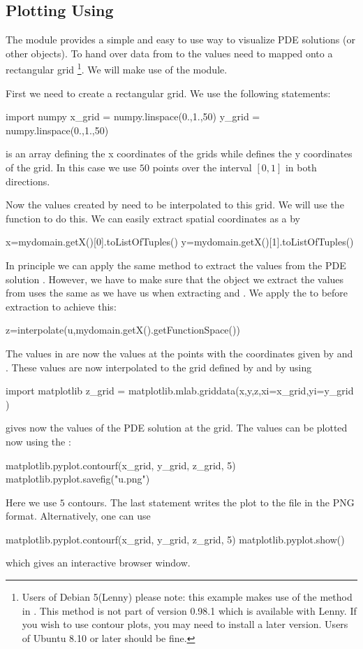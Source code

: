 \subsection{Plotting Using \MATPLOTLIB}
The \MATPLOTLIB module provides a simple and easy to use way to visualize PDE solutions (or other \Data objects). 
To hand over data from \escript to \MATPLOTLIB the values need to mapped onto a rectangular grid
\footnote{Users of Debian 5(Lenny) please note: this example makes use of the  method in .
This method is not part of version 0.98.1 which is available with Lenny.
If you wish to use contour plots, you may need to install a later version.
Users of Ubuntu 8.10 or later should be fine.}. We will make use 
of the \numpy module.

First we need to create a rectangular grid. We use the following statements:
\begin{python}
import numpy
x_grid = numpy.linspace(0.,1.,50)
y_grid = numpy.linspace(0.,1.,50)
\end{python}
 is an array defining the x coordinates of the grids while 
 defines the y coordinates of the grid. In this case we use $50$ points over the interval $[0,1]$
in both directions. 

Now the values created by \escript need to be interpolated to this grid. We will use the \MATPLOTLIB
{} function to do this. We can easily extract spatial coordinates as a  by
\begin{python}
x=mydomain.getX()[0].toListOfTuples()
y=mydomain.getX()[1].toListOfTuples()
\end{python}
In principle we can apply the same  method to extract the values from the 
PDE solution . However, we have to make sure that the \Data object we extract the values from 
uses the same \FunctionSpace as we have us when extracting  and . We apply the 
 to  before extraction to achieve this:
\begin{python}
z=interpolate(u,mydomain.getX().getFunctionSpace())
\end{python}
The values in  are now the values at the points with the coordinates given by  and . These 
values are now interpolated to the grid defined by  and  by using
\begin{python}
import matplotlib
z_grid = matplotlib.mlab.griddata(x,y,z,xi=x_grid,yi=y_grid )
\end{python}
 gives now the values of the PDE solution  at the grid. The values can be plotted now
using the :
\begin{python}
matplotlib.pyplot.contourf(x_grid, y_grid, z_grid, 5)
matplotlib.pyplot.savefig("u.png")
\end{python}
Here we use $5$ contours. The last statement writes the plot to the file  in the PNG format. Alternatively, one can use 
\begin{python}
matplotlib.pyplot.contourf(x_grid, y_grid, z_grid, 5)
matplotlib.pyplot.show()
\end{python}
which gives an interactive browser window.

